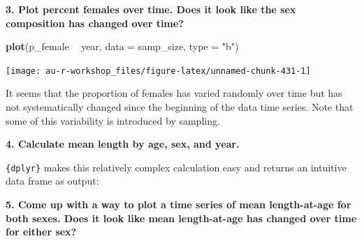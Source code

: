 \documentclass[]{book}
\newenvironment{Shaded}{\begin{snugshade}}{\end{snugshade}}
\newcommand{\DataTypeTok}[1]{\textcolor[rgb]{0.13,0.29,0.53}{#1}}
\newcommand{\KeywordTok}[1]{\textcolor[rgb]{0.13,0.29,0.53}{\textbf{#1}}}
\newcommand{\NormalTok}[1]{#1}
\newcommand{\OperatorTok}[1]{\textcolor[rgb]{0.81,0.36,0.00}{\textbf{#1}}}
\newcommand{\StringTok}[1]{\textcolor[rgb]{0.31,0.60,0.02}{#1}}
\begin{document}
\textbf{3. Plot percent females over time. Does it look like the sex composition has changed over time?}

\begin{Shaded}
\begin{Highlighting}[]
\KeywordTok{plot}\NormalTok{(p_female }\OperatorTok{~}\StringTok{ }\NormalTok{year, }\DataTypeTok{data =}\NormalTok{ samp_size, }\DataTypeTok{type =} \StringTok{"b"}\NormalTok{)}
\end{Highlighting}
\end{Shaded}

\begin{center}\texttt{[image: au-r-workshop\_files/figure-latex/unnamed-chunk-431-1]} \end{center}

It seems that the proportion of females has varied randomly over time but has not systematically changed since the beginning of the data time series. Note that some of this variability is introduced by sampling.

\textbf{4. Calculate mean length by age, sex, and year.}

\texttt{\{dplyr\}} makes this relatively complex calculation easy and returns an intuitive data frame as output:

\begin{Shaded}
\end{Shaded}

\textbf{5. Come up with a way to plot a time series of mean length-at-age for both sexes. Does it look like mean length-at-age has changed over time for either sex?}
\end{document}
